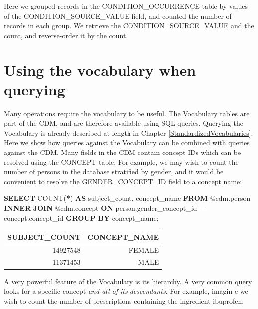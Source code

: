 \documentclass[11pt]{book}
\newenvironment{Shaded}{\begin{snugshade}}{\end{snugshade}}
\newcommand{\FunctionTok}[1]{\textcolor[rgb]{0.00,0.00,0.00}{#1}}
\newcommand{\KeywordTok}[1]{\textcolor[rgb]{0.13,0.29,0.53}{\textbf{#1}}}
\newcommand{\NormalTok}[1]{#1}
\newcommand{\OperatorTok}[1]{\textcolor[rgb]{0.81,0.36,0.00}{\textbf{#1}}}
\theoremstyle{definition}
\theoremstyle{definition}
\theoremstyle{definition}
\theoremstyle{remark}
\begin{document}
Here we grouped records in the CONDITION\_OCCURRENCE table by values of the CONDITION\_SOURCE\_VALUE field, and counted the number of records in each group. We retrieve the CONDITION\_SOURCE\_VALUE and the count, and reverse-order it by the count.

\hypertarget{using-the-vocabulary-when-querying}{%
\section{Using the vocabulary when querying}\label{using-the-vocabulary-when-querying}}

Many operations require the vocabulary to be useful. The Vocabulary tables are part of the CDM, and are therefore available using SQL queries. Querying the Vocabulary is already described at length in Chapter \ref{StandardizedVocabularies}. Here we show how queries against the Vocabulary can be combined with queries against the CDM. Many fields in the CDM contain concept IDs which can be resolved using the CONCEPT table. For example, we may wish to count the number of persons in the database stratified by gender, and it would be convenient to resolve the GENDER\_CONCEPT\_ID field to a concept name:

\begin{Shaded}
\begin{Highlighting}[]
\KeywordTok{SELECT} \FunctionTok{COUNT}\NormalTok{(}\OperatorTok{*}\NormalTok{) }\KeywordTok{AS}\NormalTok{ subject_count,}
\NormalTok{  concept_name}
\KeywordTok{FROM}\NormalTok{ @cdm.person}
\KeywordTok{INNER} \KeywordTok{JOIN}\NormalTok{ @cdm.concept}
  \KeywordTok{ON}\NormalTok{ person.gender_concept_id }\OperatorTok{=}\NormalTok{ concept.concept_id}
\KeywordTok{GROUP} \KeywordTok{BY}\NormalTok{ concept_name;}
\end{Highlighting}
\end{Shaded}

\begin{longtable}[]{@{}rr@{}}
\toprule
SUBJECT\_COUNT & CONCEPT\_NAME\tabularnewline
\midrule
\endhead
14927548 & FEMALE\tabularnewline
11371453 & MALE\tabularnewline
\bottomrule
\end{longtable}

A very powerful feature of the Vocabulary is its hierarchy. A very common query looks for a specific concept \emph{and all of its descendants}. For example, imagin e we wish to count the number of prescriptions containing the ingredient ibuprofen:
\end{document}
